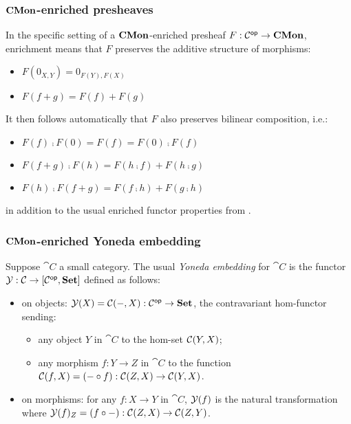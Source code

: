 \subsubsection{$\mathbf{CMon}$-enriched presheaves}

In the specific setting of a $\mathbf{CMon}$-enriched presheaf $F: \mathcal{C}^{\mathsf{op}} \to \mathbf{CMon}$, enrichment means that $F$
preserves the additive structure of morphisms:
\begin{itemize}
\item $F(0_{X,Y}) = 0_{F(Y),F(X)}$
\item $F(f + g) = F(f) + F(g)$
\end{itemize}
It then follows automatically that $F$ also preserves bilinear composition, i.e.:
\begin{itemize}
\item $F(f) \comp F(0) = F(f) = F(0) \comp F(f)$
\item $F(f + g) \comp F(h) = F(h \comp f) + F(h \comp g)$
\item $F(h) \comp F(f + g) = F(f \comp h) + F(g \comp h)$
\end{itemize}
in addition to the usual enriched functor properties from .

\subsubsection{$\mathbf{CMon}$-enriched Yoneda embedding}

Suppose $\cat{C}$ a small category. The usual \emph{Yoneda embedding} for $\cat{C}$ is the functor $\mathcal{Y}:
\mathcal{C} \to [\mathcal{C}^{\mathsf{op}},\mathbf{Set}]$ defined as follows:
\begin{itemize}
\item on objects: $\mathcal{Y}(X) = {\mathcal{C}}(-,X): \mathcal{C}^{\mathsf{op}} \to \mathbf{Set}$, the contravariant hom-functor
sending:
   \begin{itemize}
   \item any object $Y$ in $\cat{C}$ to the hom-set ${\mathcal{C}}(Y,X)$;
   \item any morphism $f: Y \to Z$ in $\cat{C}$ to the function ${\mathcal{C}}(f,X) = (- \circ f):
   {\mathcal{C}}(Z,X) \to {\mathcal{C}}(Y,X)$.
   \end{itemize}
\item on morphisms: for any $f: X \to Y$ in $\cat{C}$, $\mathcal{Y}(f)$ is the natural transformation where
$\mathcal{Y}(f)_Z = (f \circ -): {\mathcal{C}}(Z,X) \to {\mathcal{C}}(Z,Y)$.
\end{itemize}

